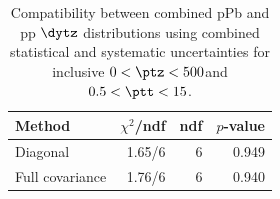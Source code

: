 \begin{table}[htp!]
\centering
\begin{tabular}{|l|r|r|r|}
\hline
Method & $\chi^2$/ndf & ndf & $p$-value \\
\hline
Diagonal & 1.65/6 & 6 & 0.949 \\
Full covariance & 1.76/6 & 6 & 0.940 \\
\hline
\end{tabular}
\caption{Compatibility between combined pPb and pp $\dytz$ distributions using combined statistical and systematic uncertainties for inclusive $0 < \ptz < 500$\GeV and $0.5 < \ptt < 15$\GeV.}
\label{table:chisq_deta}
\end{table}
